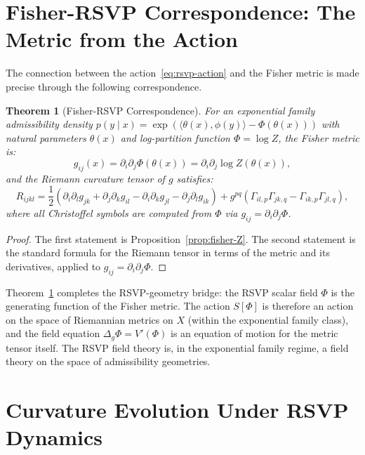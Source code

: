 \documentclass[12pt, oneside]{book}
\theoremstyle{plain-flyxion}
\newtheorem{theorem}{Theorem}[chapter]
\theoremstyle{definition-flyxion}
\begin{document}
\section{Fisher-RSVP Correspondence: The Metric from the Action}

The connection between the action~\eqref{eq:rsvp-action} and the Fisher metric is made
precise through the following correspondence.

\begin{theorem}[Fisher-RSVP Correspondence]\label{thm:fisher-rsvp}
For an exponential family admissibility density $p(y\mid x) = \exp(\langle\theta(x),
\phi(y)\rangle - \Phi(\theta(x)))$ with natural parameters $\theta(x)$ and log-partition
function $\Phi = \log Z$, the Fisher metric is:
\begin{equation}\label{eq:fisher-rsvp}
g_{ij}(x) = \partial_i\partial_j \Phi(\theta(x))
= \partial_i\partial_j \log Z(\theta(x)),
\end{equation}
and the Riemann curvature tensor of $g$ satisfies:
\begin{equation}\label{eq:curv-from-phi}
R_{ijkl} = \frac{1}{2}\left(\partial_i\partial_l g_{jk} + \partial_j\partial_k g_{il}
- \partial_i\partial_k g_{jl} - \partial_j\partial_l g_{ik}\right)
+ g^{pq}(\Gamma_{il,p}\Gamma_{jk,q} - \Gamma_{ik,p}\Gamma_{jl,q}),
\end{equation}
where all Christoffel symbols are computed from $\Phi$ via $g_{ij} = \partial_i\partial_j
\Phi$.
\end{theorem}

\begin{proof}
The first statement is Proposition~\ref{prop:fisher-Z}. The second statement is the
standard formula for the Riemann tensor in terms of the metric and its derivatives,
applied to $g_{ij} = \partial_i\partial_j\Phi$.
\end{proof}

Theorem~\ref{thm:fisher-rsvp} completes the RSVP-geometry bridge: the RSVP scalar field
$\Phi$ is the generating function of the Fisher metric. The action $S[\Phi]$ is therefore
an action on the space of Riemannian metrics on $X$ (within the exponential family class),
and the field equation $\Delta_g\Phi = V'(\Phi)$ is an equation of motion for the metric
tensor itself. The RSVP field theory is, in the exponential family regime, a field theory
on the space of admissibility geometries.

\section{Curvature Evolution Under RSVP Dynamics}
\end{document}
